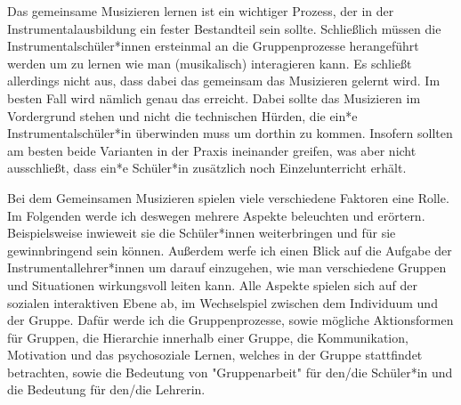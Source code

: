 
Das gemeinsame Musizieren lernen ist ein wichtiger Prozess, der in der
Instrumentalausbildung ein fester Bestandteil sein sollte. Schließlich müssen
die Instrumentalschüler*innen ersteinmal an die Gruppenprozesse herangeführt
werden um zu lernen wie man (musikalisch) interagieren kann. Es schließt
allerdings nicht aus, dass dabei das gemeinsam das Musizieren gelernt wird. Im
besten Fall wird nämlich genau das erreicht. Dabei sollte das Musizieren im
Vordergrund stehen und nicht die technischen Hürden, die ein*e
Instrumentalschüler*in überwinden muss um dorthin zu kommen. Insofern sollten am
besten beide Varianten in der Praxis ineinander greifen, was aber nicht
ausschließt, dass ein*e Schüler*in zusätzlich noch Einzelunterricht erhält.

Bei dem Gemeinsamen Musizieren spielen viele verschiedene Faktoren eine Rolle.
Im Folgenden werde ich deswegen mehrere Aspekte beleuchten und erörtern.
Beispielsweise inwieweit sie die Schüler*innen weiterbringen und für sie
gewinnbringend sein können. Außerdem werfe ich einen Blick auf die Aufgabe der
Instrumentallehrer*innen um darauf einzugehen, wie man verschiedene Gruppen und
Situationen wirkungsvoll leiten kann. Alle Aspekte spielen sich auf der sozialen
interaktiven Ebene ab, im Wechselspiel zwischen dem Individuum und der Gruppe.
Dafür werde ich die Gruppenprozesse, sowie mögliche Aktionsformen für Gruppen,
die Hierarchie innerhalb einer Gruppe, die Kommunikation, Motivation und das
psychosoziale Lernen, welches in der Gruppe stattfindet betrachten, sowie die
Bedeutung von "Gruppenarbeit" für den/die Schüler*in und die Bedeutung für
den/die Lehrerin.






























